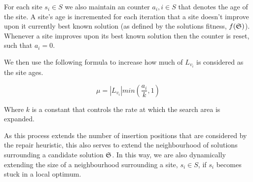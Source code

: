For each site $s_i \in S$ we also maintain an counter $a_i, i \in S$ that denotes the age of the site. A site's age is incremented for each iteration that a site doesn't improve upon it currently best known solution (as defined by the solutions fitness, $f(\mathfrak{S})$). Whenever a site improves upon its best known solution then the counter is reset, such that $a_i = 0$.


We then use the following formula to increase how much of $L_{v_i}$ is considered as the site ages.

\[
   \mu = \left|L_{v_i}\right| min\left(\frac{a_i}{k}, 1\right)
\]

Where $k$ is a constant that controls the rate at which the search area is expanded. 

As this process extends the number of insertion positions that are considered by the repair heuristic, this also serves to extend the neighbourhood of solutions surrounding a candidate solution $\mathfrak{S}$. In this way, we are also dynamically extending the size of a neighbourhood surrounding a site, $s_i \in S$, if $s_i$ becomes stuck in a local optimum.


